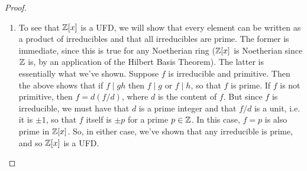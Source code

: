 \begin{proof}
\begin{enumerate}
\item To see that $\mathbb{Z}[x]$ is a UFD, we will show that every element can be written as a product of irreducibles and that all irreducibles are prime. The former is immediate, since this is true for any Noetherian ring ($\mathbb{Z}[x]$ is Noetherian since $\mathbb{Z}$ is, by an application of the Hilbert Basis Theorem). The latter is essentially what we've shown. Suppose $f$ is irreducible and primitive. Then the above shows that if $f \mid gh$ then $f \mid g$ or $f \mid h$, so that $f$ is prime. If $f$ is not primitive, then $f = d(f/d)$, where $d$ is the content of $f$. But since $f$ is irreducible, we must have that $d$ is a prime integer and that $f/d$ is a unit, i.e. it is $\pm 1$, so that $f$ itself is $\pm p$ for a prime $p \in \mathbb{Z}$. In this case, $f = p$ is also prime in $\mathbb{Z}[x]$. So, in either case, we've shown that any irreducible is prime, and so $\mathbb{Z}[x]$ is a UFD.
\end{enumerate}
\end{proof}
